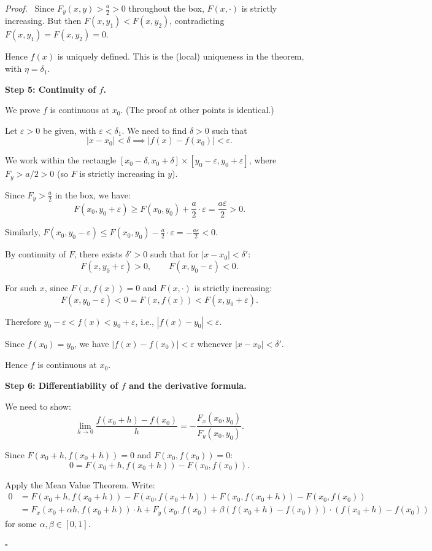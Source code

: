 \documentclass[11pt]{report}
\renewenvironment{proof}[1][Proof]{\par\noindent\textit{#1.}\ }{\hfill$\square$\par\medskip}
\begin{document}
\begin{proof}
Since $F_y(x, y) > \frac{a}{2} > 0$ throughout the box, $F(x, \cdot)$ is strictly increasing. But then $F(x, y_1) < F(x, y_2)$, contradicting $F(x, y_1) = F(x, y_2) = 0$.

Hence $f(x)$ is uniquely defined. This is the (local) uniqueness in the theorem, with $\eta = \delta_1$.

\textbf{Step 5: Continuity of $f$.}

We prove $f$ is continuous at $x_0$. (The proof at other points is identical.)

Let $\varepsilon > 0$ be given, with $\varepsilon < \delta_1$. We need to find $\delta > 0$ such that
\[
|x - x_0| < \delta \implies |f(x) - f(x_0)| < \varepsilon.
\]

We work within the rectangle $[x_0 - \delta, x_0 + \delta] \times [y_0 - \varepsilon, y_0 + \varepsilon]$, where $F_y > a/2 > 0$ (so $F$ is strictly increasing in $y$).

Since $F_y > \frac{a}{2}$ in the box, we have:
\[
F(x_0, y_0 + \varepsilon) \geq F(x_0, y_0) + \frac{a}{2} \cdot \varepsilon = \frac{a\varepsilon}{2} > 0.
\]

Similarly, $F(x_0, y_0 - \varepsilon) \leq F(x_0, y_0) - \frac{a}{2} \cdot \varepsilon = -\frac{a\varepsilon}{2} < 0$.

By continuity of $F$, there exists $\delta' > 0$ such that for $|x - x_0| < \delta'$:
\[
F(x, y_0 + \varepsilon) > 0, \qquad F(x, y_0 - \varepsilon) < 0.
\]

For such $x$, since $F(x, f(x)) = 0$ and $F(x, \cdot)$ is strictly increasing:
\[
F(x, y_0 - \varepsilon) < 0 = F(x, f(x)) < F(x, y_0 + \varepsilon).
\]

Therefore $y_0 - \varepsilon < f(x) < y_0 + \varepsilon$, i.e., $|f(x) - y_0| < \varepsilon$.

Since $f(x_0) = y_0$, we have $|f(x) - f(x_0)| < \varepsilon$ whenever $|x - x_0| < \delta'$.

Hence $f$ is continuous at $x_0$.

\textbf{Step 6: Differentiability of $f$ and the derivative formula.}

We need to show:
\[
\lim_{h \to 0} \frac{f(x_0 + h) - f(x_0)}{h} = -\frac{F_x(x_0, y_0)}{F_y(x_0, y_0)}.
\]

Since $F(x_0 + h, f(x_0 + h)) = 0$ and $F(x_0, f(x_0)) = 0$:
\[
0 = F(x_0 + h, f(x_0 + h)) - F(x_0, f(x_0)).
\]

Apply the Mean Value Theorem. Write:
\begin{align*}
0 &= F(x_0 + h, f(x_0 + h)) - F(x_0, f(x_0 + h)) + F(x_0, f(x_0 + h)) - F(x_0, f(x_0)) \\
&= F_x(x_0 + \alpha h, f(x_0 + h)) \cdot h + F_y(x_0, f(x_0) + \beta(f(x_0 + h) - f(x_0))) \cdot (f(x_0 + h) - f(x_0))
\end{align*}
for some $\alpha, \beta \in [0, 1]$.


\end{proof}
\end{document}
